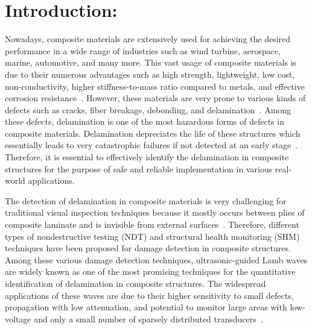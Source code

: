 \section{Introduction:}

Nowadays, composite materials are extensively used for achieving the desired performance in a wide range of industries such as wind turbine, aerospace, marine, automotive, and many more.
This vast usage of composite materials is due to their numerous advantages such as high strength, lightweight, low cost, non-conductivity, higher stiffness-to-mass ratio compared to metals, and effective corrosion resistance~\cite{baker2004composite, giurgiutiu2015structural, stoik2010nondestructive, poudel2015comparison}. 
However, these materials are very prone to various kinds of defects such as cracks, fiber breakage, debonding, and delamination~\cite{poudel2015comparison, heslehurst2014defects, talreja2012damage}.
Among these defects, delamination is one of the most hazardous forms of defects in composite materials. 
Delamination depreciates the life of these structures which essentially leads to very catastrophic failures if not detected at an early stage~\cite{talreja2012damage, wisnom2012role}.
Therefore, it is essential to effectively identify the delamination
in composite structures for the purpose of safe and reliable implementation in
various real-world applications.

The detection of delamination in composite materials is very challenging for traditional visual inspection techniques because it mostly occurs between plies of composite laminate and is invisible from external surfaces~\cite{guinard20023d, staszewski2009health, tuo2019damage}.
Therefore, different types of nondestructive testing (NDT) and structural health monitoring (SHM) techniques have been proposed for damage detection in composite structures.
Among these various damage detection techniques, ultrasonic-guided Lamb waves are widely known as one of the most promising techniques for the quantitative identification of delamination in composite structures.
The widespread applications of these waves are due to their higher sensitivity to small defects, propagation with low attenuation, and potential to monitor large areas with low-voltage and only a small number of sparsely distributed transducers~\cite{alleyne1992interaction, mitra2016guided, giurgiutiu2003lamb, ihn2008pitch}.

